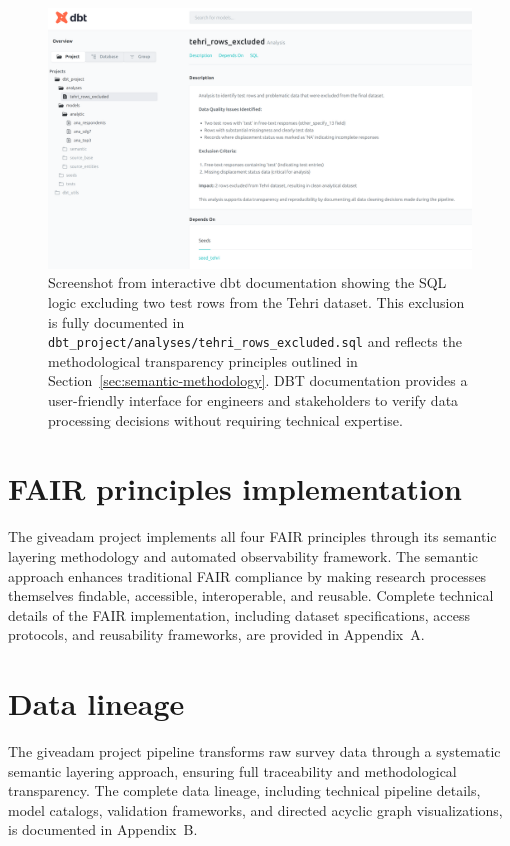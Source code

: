 \documentclass{article}
\begin{document}
\begin{figure}[ht]
  \centering
  \includegraphics[width=\textwidth]{img/dbt-docs-tehri-exclusions.png}
  \caption{\label{fig:tehri-exclusions} Screenshot from interactive dbt documentation showing the SQL logic excluding two test rows from the Tehri dataset. This exclusion is fully documented in \texttt{dbt\_project/analyses/tehri\_rows\_excluded.sql} and reflects the methodological transparency principles outlined in Section~\ref{sec:semantic-methodology}. DBT documentation provides a user-friendly interface for engineers and stakeholders to verify data processing decisions without requiring technical expertise.}
\end{figure}

\section{FAIR principles implementation}
\label{sec:fair}

The giveadam project implements all four FAIR principles through its semantic layering methodology and automated observability framework. The semantic approach enhances traditional FAIR compliance by making research processes themselves findable, accessible, interoperable, and reusable. Complete technical details of the FAIR implementation, including dataset specifications, access protocols, and reusability frameworks, are provided in Appendix~A.

\section{Data lineage}
\label{sec:data-lineage}

The giveadam project pipeline transforms raw survey data through a systematic semantic layering approach, ensuring full traceability and methodological transparency. The complete data lineage, including technical pipeline details, model catalogs, validation frameworks, and directed acyclic graph visualizations, is documented in Appendix~B.
\end{document}
